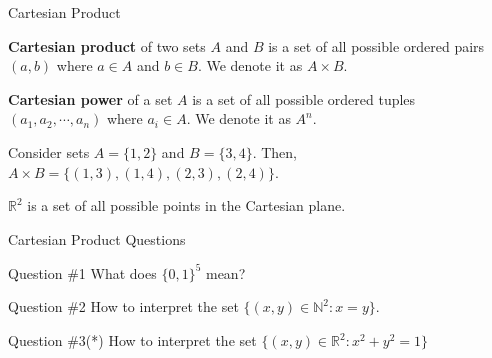 \documentclass{beamer}
\begin{document}
    \begin{frame}{Cartesian Product}
        \begin{definition}
          \textbf{Cartesian product} of two sets $A$ and $B$ is a set of all possible ordered pairs $(a,b)$ where $a \in A$ and $b \in B$. We denote it as $A \times B$.
        \end{definition}

        \begin{definition}
          \textbf{Cartesian power} of a set $A$ is a set of all possible ordered tuples $(a_1,a_2,\cdots,a_n)$ where $a_i \in A$. We denote it as $A^n$.
        \end{definition}

        \begin{example}
          Consider sets $A = \{1,2\}$ and $B = \{3,4\}$. Then, $A \times B = \{(1,3), (1,4), (2,3), (2,4)\}$.
        \end{example}

        \begin{example}
          $\mathbb{R}^2$ is a set of all possible points in the Cartesian plane.
        \end{example}
    \end{frame}

    \begin{frame}{Cartesian Product Questions}
      \begin{alertblock}{Question \#1}
        What does $\{0,1\}^{5}$ mean?
      \end{alertblock}

      \begin{alertblock}{Question \#2}
        How to interpret the set $\{(x,y) \in \mathbb{N}^2: x = y\}$.
      \end{alertblock}

      \begin{alertblock}{Question \#3(*)}
        How to interpret the set $\{(x,y) \in \mathbb{R}^2: x^2+y^2=1\}$
      \end{alertblock}
    \end{frame}
\end{document}
